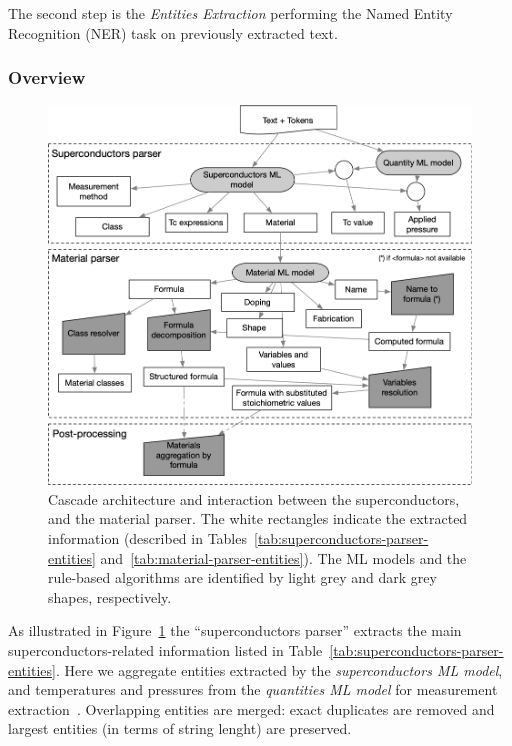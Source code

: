 \documentclass{article}
\begin{document}
The second step is the \textit{Entities Extraction} performing the Named Entity Recognition (NER) task on previously extracted text. 

\subsubsection{Overview}

\begin{figure}[ht]
\includegraphics[width=\textwidth]{extraction-schema-4}
\caption{\label{fig:extraction-ml-models-cascade-architecture} Cascade architecture and interaction between the superconductors, and the material parser. The white rectangles indicate the extracted information (described in Tables~\ref{tab:superconductors-parser-entities} and~\ref{tab:material-parser-entities}). 
The ML models and the rule-based algorithms are identified by light grey and dark grey shapes, respectively.}
\end{figure}

As illustrated in Figure~\ref{fig:extraction-ml-models-cascade-architecture} the ``superconductors parser'' extracts the main superconductors-related information listed in Table~\ref{tab:superconductors-parser-entities}. 
Here we aggregate entities extracted by the \textit{superconductors ML model}, and temperatures and pressures from the \textit{quantities ML model} for measurement extraction~\cite{foppiano2019quantities}. 
Overlapping entities are merged: exact duplicates are removed and largest entities (in terms of string lenght) are preserved.
\end{document}
